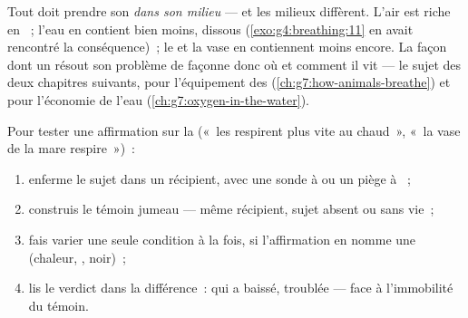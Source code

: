 \begin{proposition}\label{prop:g7:what-is-respiration:habitats}
Tout  doit prendre son  \emph{dans son milieu}
--- et les milieux diffèrent. L'air est riche en ~; l'eau
en contient bien moins, dissous
(\cref{exo:g4:breathing:11} en avait rencontré la conséquence)~; le
 et la vase en contiennent moins encore. La façon dont un  résout son problème de  façonne donc où et comment
il vit --- le sujet des deux chapitres suivants, pour l'équipement
des  (\cref{ch:g7:how-animals-breathe}) et pour l'économie de
l'eau (\cref{ch:g7:oxygen-in-the-water}).
\end{proposition}
\admitted

\begin{method}\label{met:g7:what-is-respiration:test}
Pour tester une affirmation sur la  («~les 
respirent plus vite au chaud~», «~la vase de la mare respire~»)~:
\begin{enumerate}
  \item enferme le sujet dans un récipient, avec une sonde à
         ou un piège à ~;
  \item construis le témoin jumeau --- même récipient, sujet absent
        ou sans vie~;
  \item fais varier une seule condition à la fois, si
        l'affirmation en nomme une (chaleur, , noir)~;
  \item lis le verdict dans la différence~:  qui a baissé,
         troublée --- face à l'immobilité du témoin.
\end{enumerate}
\end{method}

